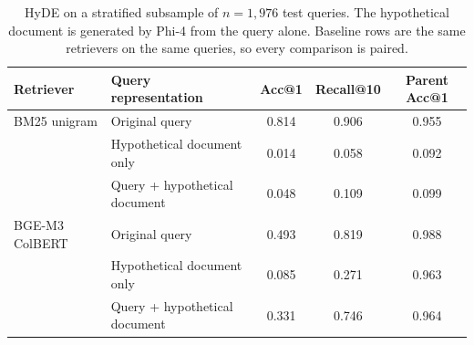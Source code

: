 \begin{table}[ht]
\centering
\caption{HyDE on a stratified subsample of $n=1{,}976$ test queries. The hypothetical document is generated by Phi-4 from the query alone. Baseline rows are the same retrievers on the same queries, so every comparison is paired.}
\label{tab:hyde}
\begin{tabular}{llccc}
\toprule
\textbf{Retriever} & \textbf{Query representation} & \textbf{Acc@1} & \textbf{Recall@10} & \textbf{Parent Acc@1} \\
\midrule
BM25 unigram & Original query & 0.814 & 0.906 & 0.955 \\
 & Hypothetical document only & 0.014 & 0.058 & 0.092 \\
 & Query + hypothetical document & 0.048 & 0.109 & 0.099 \\
\midrule
BGE-M3 ColBERT & Original query & 0.493 & 0.819 & 0.988 \\
 & Hypothetical document only & 0.085 & 0.271 & 0.963 \\
 & Query + hypothetical document & 0.331 & 0.746 & 0.964 \\
\bottomrule
\end{tabular}
\end{table}
